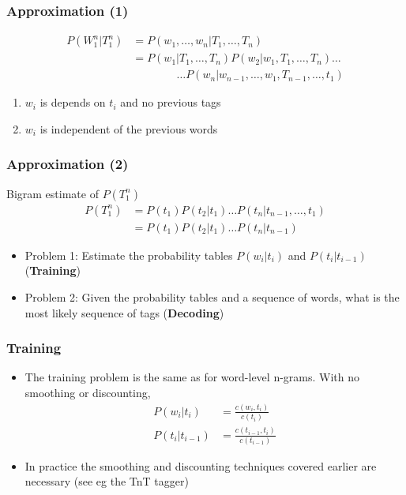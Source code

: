 \begin{frame}
  \frametitle{Approximation (1)}
  \begin{align*}
    P(W_1^n | T_1^n) &= P(w_1,\ldots,w_n | T_1,\ldots,T_n) \\
    &= P(w_1 | T_1,\ldots,T_n) P(w_2 | w_1, T_1,\ldots,T_n) \ldots \\
    & \qquad \qquad \ldots 
    P(w_n | w_{n-1},\ldots,w_1, T_{n-1}, \ldots, t_1)
  \end{align*}
  
  \begin{enumerate}
  \item<3-> $w_i$ is depends on $t_i$ and no previous tags
  \item<4-> $w_i$ is independent of the previous words
  \end{enumerate}
\end{frame}

\begin{frame}
  \frametitle{Approximation (2)}
  Bigram estimate of $P(T_1^n)$
  \begin{align*}
    P(T_1^n) &= P(t_1) P(t_2 | t_1) \ldots P(t_n | t_{n-1}, \ldots,
    t_1)\\
    &= P(t_1) P(t_2 | t_1) \ldots P(t_n | t_{n-1})
  \end{align*}


  \begin{itemize}
  \item<3-> Problem 1: Estimate the probability tables $P(w_i | t_i)$ and
    $P(t_i|t_{i-1})$  (\textbf{Training})
  \item<4-> Problem 2: Given the probability tables and a sequence of
    words, what is the most likely sequence of tags (\textbf{Decoding})
  \end{itemize} 
\end{frame}

\begin{frame}
  \frametitle{Training}
  \begin{itemize}
  \item<1-> The training problem is the same as for word-level n-grams.
    With no smoothing or discounting,
    \begin{align*}
      P(w_i | t_i) &= \frac{c(w_i,t_i)}{c(t_i)} \\
      P(t_i | t_{i-1}) &=  \frac{c(t_{i-1}, t_i)}{c(t_{i-1})}
    \end{align*}
  \item<2-> In practice the smoothing and discounting techniques covered
    earlier are necessary (see eg the TnT tagger)
  \end{itemize}
\end{frame}

